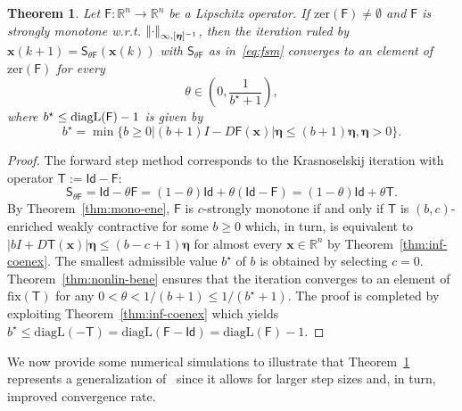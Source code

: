 \documentclass[journal,twoside,web]{ieeecolor}
\newcommand{\abs}[1]{{\left\vert #1 \right\vert}}
\newcommand{\norm}[1]{{\left\vert\kern-0.25ex\left\vert #1\right\vert\kern-0.25ex\right\vert}}
\newcommand{\rea }{\mathbb{R}}
\newcommand{\xb}{\boldsymbol{x}}
\newcommand{\etab}{\boldsymbol{\eta}}
\newcommand{\Fs}{\mathsf{F}}
\newcommand{\Ss}{\mathsf{S}}
\newcommand{\Ts}{\mathsf{T}}
\newcommand{\Is}{\mathsf{Id}}
\newcommand{\fix}{\mathrm{fix}}
\newcommand{\zer}{\mathrm{zer}}
\newtheorem{thm}{Theorem}
\begin{document}
%
\begin{thm}\label{thm:fsm}
    Let $\Fs:\rea^n\rightarrow\rea^n$ be a Lipschitz operator. If $\zer(\Fs)\neq \emptyset $ and $\Fs$ is strongly monotone w.r.t. $\norm{\cdot}_{\infty,[\etab]^{-1}}$, then the iteration ruled by $\xb(k+1)=\Ss_{\theta\Fs}(\xb(k))$ with $\Ss_{\theta\Fs}$ as in~\eqref{eq:fsm} converges to an element of $\zer(\Fs)$ for every 
    $$
    \theta \in\left(0,\frac{1}{b^\star+1}\right),
    $$
    where $b^\star\leq \text{\normalfont{diagL}}(\Fs)-1$ is given by
    $$
    b^\star = \min\{b\geq 0 \abs{(b+1) I - D\Fs(\xb)}\etab \leq (b+1)\etab,\etab>0\}.
    $$
\end{thm}
%
\begin{proof}
   The forward step method corresponds to the Krasnoselskij iteration with operator $\Ts:=\Is-\Fs$:
    $$
    \Ss_{\theta\Fs} = \Is-\theta \Fs= (1-\theta)\Is+\theta (\Is-\Fs) = (1-\theta)\Is+\theta \Ts. 
    $$
    By Theorem~\ref{thm:mono-ene}, $\Fs$ is $c$-strongly monotone if and only if $\Ts$ is $(b,c)$-enriched weakly contractive for some $b\geq 0$ which, in turn, is equivalent to $\abs{b I + D\Ts(\xb)}\etab \leq (b-c+1)\etab$ for almost every $\xb\in\rea^n$ by Theorem~\ref{thm:inf-coenex}. The smallest admissible value $b^\star$ of $b$ is obtained by selecting $c=0$. Theorem~\ref{thm:nonlin-bene} ensures that the iteration converges to an element of $\fix(\Ts)$ for any $0<\theta < 1/(b+1)\leq 1/(b^\star+1)$. The proof is completed by exploiting Theorem~\ref{thm:inf-coenex} which yields $b^\star\leq  \text{diagL}(-\Ts) = \text{diagL}(\Fs-\Is) = \text{diagL}(\Fs) -1$.
\end{proof}

We now provide some numerical simulations to illustrate that Theorem~\ref{thm:fsm} represents a generalization of~\cite[Theorem 26]{davydov2024non} since it allows for larger step sizes and, in turn, improved convergence rate.
\end{document}
